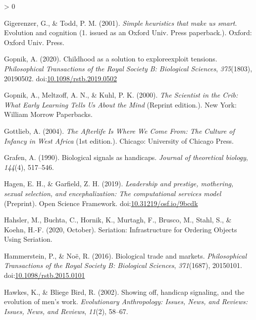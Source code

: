 \documentclass[
  11pt,
]{article}
\newlength{\cslhangindent}
\newenvironment{CSLReferences}[2] %
 {%
  \setlength{\parindent}{0pt}
  \ifodd #1 \everypar{\setlength{\hangindent}{\cslhangindent}}\ignorespaces\fi
  \ifnum #2 > 0
  \setlength{\parskip}{#2\baselineskip}
  \fi
 }%
 {}
\begin{document}
\begin{CSLReferences}{1}{0}
\leavevmode\hypertarget{ref-gigerenzerSimpleHeuristicsThat2001}{}%
Gigerenzer, G., \& Todd, P. M. (2001). \emph{Simple heuristics that make us smart}. Evolution and cognition (1. issued as an Oxford Univ. Press paperback.). {Oxford}: {Oxford Univ. Press}.

\leavevmode\hypertarget{ref-gopnikChildhoodSolutionExplore2020}{}%
Gopnik, A. (2020). Childhood as a solution to explore{}exploit tensions. \emph{Philosophical Transactions of the Royal Society B: Biological Sciences}, \emph{375}(1803), 20190502. doi:\href{https://doi.org/10.1098/rstb.2019.0502}{10.1098/rstb.2019.0502}

\leavevmode\hypertarget{ref-gopnikScientistCribWhat2000}{}%
Gopnik, A., Meltzoff, A. N., \& Kuhl, P. K. (2000). \emph{The {Scientist} in the {Crib}: {What Early Learning Tells Us About} the {Mind}} (Reprint edition.). {New York}: {William Morrow Paperbacks}.

\leavevmode\hypertarget{ref-gottliebAfterlifeWhereWe2004}{}%
Gottlieb, A. (2004). \emph{The {Afterlife Is Where We Come From}: {The Culture} of {Infancy} in {West Africa}} (1st edition.). {Chicago}: {University of Chicago Press}.

\leavevmode\hypertarget{ref-grafenBiologicalSignalsHandicaps1990}{}%
Grafen, A. (1990). Biological signals as handicaps. \emph{Journal of theoretical biology}, \emph{144}(4), 517--546.

\leavevmode\hypertarget{ref-hagenLeadershipPrestigeMothering2019}{}%
Hagen, E. H., \& Garfield, Z. H. (2019). \emph{Leadership and prestige, mothering, sexual selection, and encephalization: {The} computational services model} (Preprint). {Open Science Framework}. doi:\href{https://doi.org/10.31219/osf.io/9bcdk}{10.31219/osf.io/9bcdk}

\leavevmode\hypertarget{ref-hahslerSeriationInfrastructureOrdering2020}{}%
Hahsler, M., Buchta, C., Hornik, K., Murtagh, F., Brusco, M., Stahl, S., \& Koehn, H.-F. (2020, October). Seriation: {Infrastructure} for {Ordering Objects Using Seriation}.

\leavevmode\hypertarget{ref-hammersteinBiologicalTradeMarkets2016a}{}%
Hammerstein, P., \& Noë, R. (2016). Biological trade and markets. \emph{Philosophical Transactions of the Royal Society B: Biological Sciences}, \emph{371}(1687), 20150101. doi:\href{https://doi.org/10.1098/rstb.2015.0101}{10.1098/rstb.2015.0101}

\leavevmode\hypertarget{ref-hawkesShowingHandicapSignaling2002}{}%
Hawkes, K., \& Bliege Bird, R. (2002). Showing off, handicap signaling, and the evolution of men's work. \emph{Evolutionary Anthropology: Issues, News, and Reviews: Issues, News, and Reviews}, \emph{11}(2), 58--67.


\end{CSLReferences}
\end{document}
